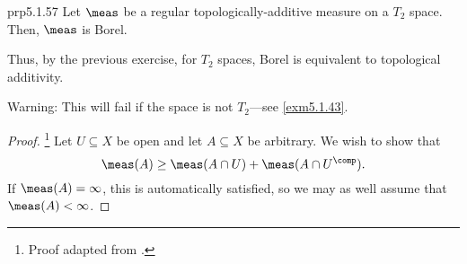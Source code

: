 \begin{prp}{}{prp5.1.57}
Let $\meas$ be a regular topologically-additive measure on a $T_2$ space.  Then, $\meas$ is Borel.
\begin{rmk}
Thus, by the previous exercise, for $T_2$ spaces, Borel is equivalent to topological additivity.
\end{rmk}
\begin{wrn}
Warning:  This will fail if the space is not $T_2$---see \cref{exm5.1.43}.
\end{wrn}
\begin{proof}\footnote{Proof adapted from \cite[pg.~194]{Cohn}.}
Let $U\subseteq X$ be open and let $A\subseteq X$ be arbitrary.  We wish to show that
\begin{equation}
\meas (A)\geq \meas (A\cap U)+\meas (A\cap U^{\comp}).
\end{equation}
If $\meas (A)=\infty$, this is automatically satisfied, so we may as well assume that $\meas (A)<\infty$.


\end{proof}
\end{prp}

